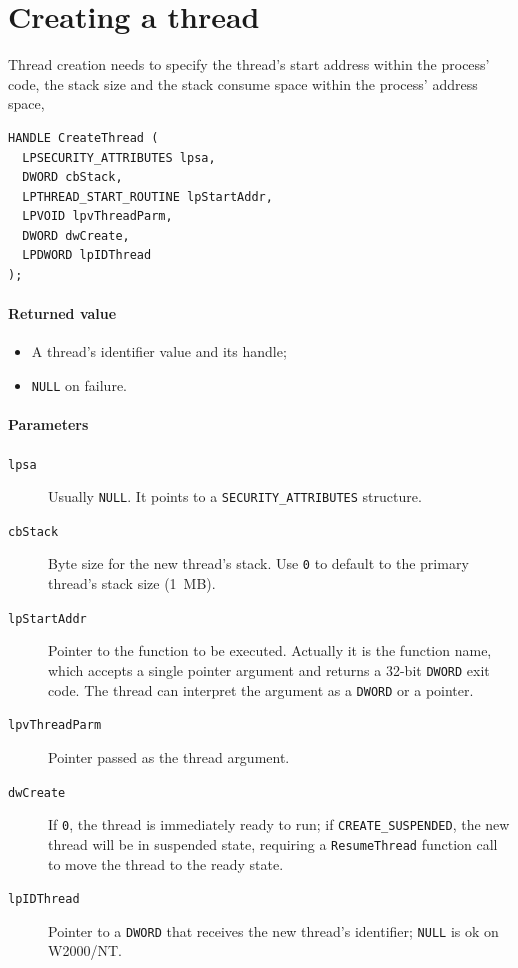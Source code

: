 \section{Creating a thread}
Thread creation needs to specify the thread's start address within the process' code, the stack size and the stack consume space within the process' address space,

\begin{verbatim}
HANDLE CreateThread (
  LPSECURITY_ATTRIBUTES lpsa,
  DWORD cbStack,
  LPTHREAD_START_ROUTINE lpStartAddr,
  LPVOID lpvThreadParm,
  DWORD dwCreate,
  LPDWORD lpIDThread
);
\end{verbatim}

\paragraph{Returned value}
\begin{itemize}
\item A thread's identifier value and its handle;
\item \texttt{NULL} on failure.
\end{itemize}

\paragraph{Parameters}
\begin{description}
\item [\texttt{lpsa}] Usually \texttt{NULL}. It points to a \texttt{SECURITY\_ATTRIBUTES} structure.
\item [\texttt{cbStack}] Byte size for the new thread's stack. Use \texttt{0} to default to the primary thread's stack size (1~MB).
\item [\texttt{lpStartAddr}] Pointer to the function to be executed. Actually it is the function name, which accepts a single pointer argument and returns a 32-bit \texttt{DWORD} exit code. The thread can interpret the argument as a \texttt{DWORD} or a pointer.
\item [\texttt{lpvThreadParm}] Pointer passed as the thread argument.
\item [\texttt{dwCreate}] If \texttt{0}, the thread is immediately ready to run; if \texttt{CREATE\_SUSPENDED}, the new thread will be in suspended state, requiring a \texttt{ResumeThread} function call to move the thread to the ready state.
\item [\texttt{lpIDThread}] Pointer to a \texttt{DWORD} that receives the new thread's identifier; \texttt{NULL} is ok on W2000/NT.
\end{description}

